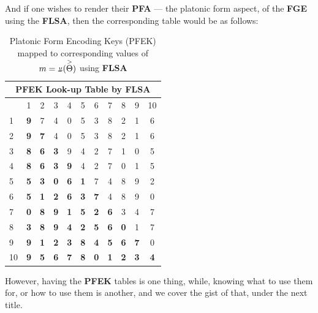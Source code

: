 \documentclass[a4paper, 18pt]{book} %
\newcommand{\invpi}{\rotatebox[origin=c]{180}{$\pi$}}
\begin{document}
\begin{appendices}
And if one wishes to render their \textbf{PFA} --- the platonic form aspect, of the \textbf{FGE} using the \textbf{FLSA}, then the corresponding table would be as follows:\\


\begin{table}[H]
  \centering
  \Large
	\begin{tabular}[t]{|p{6cm}||c|c|c|c|c|c|c|c|c|c|}
	\hline
	\multicolumn{11}{|c|}{\textbf{PFEK Look-up Table by FLSA}}\\
	\hline
	\hline
	\diagbox{$m = \invpi(\overset{>}{\Theta})$}{$I(\omega_i,\overset{>}{\Theta})$} & 1 & 2 & 3 & 4 & 5 & 6 & 7 & 8 & 9 & 10\\
	\hline
	\hline
	1 & \textbf{9} & 7 & 4 & 0 & 5 & 3 & 8 & 2 & 1 & 6\\ 
	\hline 
	2 & \textbf{9} & \textbf{7} & 4 & 0 & 5 & 3 & 8 & 2 & 1 & 6\\ 
	\hline 
	3 & \textbf{8} & \textbf{6} & \textbf{3} & 9 & 4 & 2 & 7 & 1 & 0 & 5\\ 
	\hline 
	4 & \textbf{8} & \textbf{6} & \textbf{3} & \textbf{9} & 4 & 2 & 7 & 0 & 1 & 5\\
	\hline
	5 & \textbf{5} & \textbf{3} & \textbf{0} & \textbf{6} & \textbf{1} & 7 & 4 & 8 & 9 & 2\\
	\hline
	6 & \textbf{5} & \textbf{1} & \textbf{2} & \textbf{6} & \textbf{3} & \textbf{7} & 4 & 8 & 9 & 0\\
	\hline 
	7 & \textbf{0} & \textbf{8} & \textbf{9} & \textbf{1} & \textbf{5} & \textbf{2} & \textbf{6} & 3 & 4 & 7\\
	\hline 
	8 & \textbf{3} & \textbf{8} & \textbf{9} & \textbf{4} & \textbf{2} & \textbf{5} & \textbf{6} & \textbf{0} & 1 & 7\\
	\hline
	9 & \textbf{9} & \textbf{1} & \textbf{2} & \textbf{3} & \textbf{8} & \textbf{4} & \textbf{5} & \textbf{6} & \textbf{7} & 0\\ 
	\hline
	10 & \textbf{9} & \textbf{5} & \textbf{6} & \textbf{7} & \textbf{8} & \textbf{0} & \textbf{1} & \textbf{2} & \textbf{3} & \textbf{4}\\
	\hline
	              
\end{tabular}
 \caption{Platonic Form Encoding Keys (PFEK) mapped to corresponding values of $m = \invpi(\overset{>}{\Theta})$ using \textbf{FLSA}}
  \label{TABFSLAPERK}
\end{table}


However, having the \textbf{PFEK} tables is one thing, while, knowing what to use them for, or how to use them is another, and we cover the gist of that, under the next title.



\end{appendices}
\end{document}
